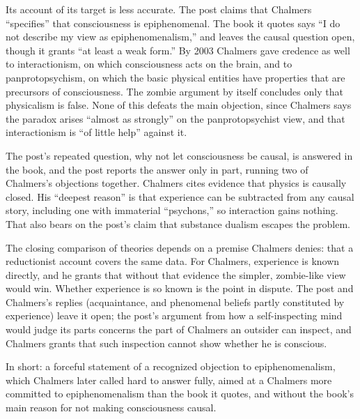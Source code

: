 \begin{afterword}
Its account of its target is less accurate. The post claims that Chalmers ``specifies'' that consciousness is epiphenomenal. The book it quotes says ``I do not describe my view as epiphenomenalism,'' and leaves the causal question open, though it grants ``at least a weak form.'' By 2003 Chalmers gave credence as well to interactionism, on which consciousness acts on the brain, and to panprotopsychism, on which the basic physical entities have properties that are precursors of consciousness. The zombie argument by itself concludes only that physicalism is false. None of this defeats the main objection, since Chalmers says the paradox arises ``almost as strongly'' on the panprotopsychist view, and that interactionism is ``of little help'' against it.

The post's repeated question, why not let consciousness be causal, is answered in the book, and the post reports the answer only in part, running two of Chalmers's objections together. Chalmers cites evidence that physics is causally closed. His ``deepest reason'' is that experience can be subtracted from any causal story, including one with immaterial ``psychons,'' so interaction gains nothing. That also bears on the post's claim that substance dualism escapes the problem.

The closing comparison of theories depends on a premise Chalmers denies: that a reductionist account covers the same data. For Chalmers, experience is known directly, and he grants that without that evidence the simpler, zombie-like view would win. Whether experience is so known is the point in dispute. The post and Chalmers's replies (acquaintance, and phenomenal beliefs partly constituted by experience) leave it open; the post's argument from how a self-inspecting mind would judge its parts concerns the part of Chalmers an outsider can inspect, and Chalmers grants that such inspection cannot show whether he is conscious.

In short: a forceful statement of a recognized objection to epiphenomenalism, which Chalmers later called hard to answer fully, aimed at a Chalmers more committed to epiphenomenalism than the book it quotes, and without the book's main reason for not making consciousness causal.
\end{afterword}
